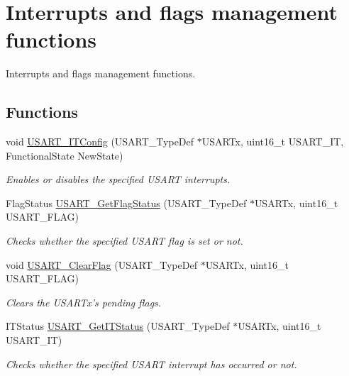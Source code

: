 \hypertarget{group___u_s_a_r_t___group9}{\section{Interrupts and flags management functions}
\label{group___u_s_a_r_t___group9}
}


Interrupts and flags management functions.  


\subsection*{Functions}
\begin{DoxyCompactItemize}
\item 
void \hyperlink{group___u_s_a_r_t___group9_ga6d8f2dd1f34060ae7e386e3e5d56b6f6}{U\-S\-A\-R\-T\-\_\-\-I\-T\-Config} (U\-S\-A\-R\-T\-\_\-\-Type\-Def $\ast$U\-S\-A\-R\-Tx, uint16\-\_\-t U\-S\-A\-R\-T\-\_\-\-I\-T, Functional\-State New\-State)
\begin{DoxyCompactList}\small\item\em Enables or disables the specified U\-S\-A\-R\-T interrupts. \end{DoxyCompactList}\item 
Flag\-Status \hyperlink{group___u_s_a_r_t___group9_ga144630722defc9e312f0ad280b68e9da}{U\-S\-A\-R\-T\-\_\-\-Get\-Flag\-Status} (U\-S\-A\-R\-T\-\_\-\-Type\-Def $\ast$U\-S\-A\-R\-Tx, uint16\-\_\-t U\-S\-A\-R\-T\-\_\-\-F\-L\-A\-G)
\begin{DoxyCompactList}\small\item\em Checks whether the specified U\-S\-A\-R\-T flag is set or not. \end{DoxyCompactList}\item 
void \hyperlink{group___u_s_a_r_t___group9_gad962e148fc466ae1b45b288f6c91d966}{U\-S\-A\-R\-T\-\_\-\-Clear\-Flag} (U\-S\-A\-R\-T\-\_\-\-Type\-Def $\ast$U\-S\-A\-R\-Tx, uint16\-\_\-t U\-S\-A\-R\-T\-\_\-\-F\-L\-A\-G)
\begin{DoxyCompactList}\small\item\em Clears the U\-S\-A\-R\-Tx's pending flags. \end{DoxyCompactList}\item 
I\-T\-Status \hyperlink{group___u_s_a_r_t___group9_ga93d8f031241bcdbe938d091a85295445}{U\-S\-A\-R\-T\-\_\-\-Get\-I\-T\-Status} (U\-S\-A\-R\-T\-\_\-\-Type\-Def $\ast$U\-S\-A\-R\-Tx, uint16\-\_\-t U\-S\-A\-R\-T\-\_\-\-I\-T)
\begin{DoxyCompactList}\small\item\em Checks whether the specified U\-S\-A\-R\-T interrupt has occurred or not. \end{DoxyCompactList}\item 

\end{DoxyCompactItemize}
